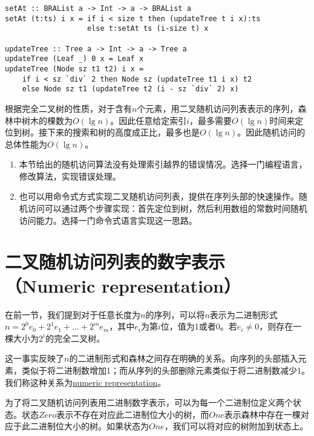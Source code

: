 \documentclass[UTF8]{article}
\begin{document}
\begin{lstlisting}[style=Haskell]
setAt :: BRAList a -> Int -> a -> BRAList a
setAt (t:ts) i x = if i < size t then (updateTree t i x):ts
                   else t:setAt ts (i-size t) x

updateTree :: Tree a -> Int -> a -> Tree a
updateTree (Leaf _) 0 x = Leaf x
updateTree (Node sz t1 t2) i x =
    if i < sz `div` 2 then Node sz (updateTree t1 i x) t2
    else Node sz t1 (updateTree t2 (i - sz `div` 2) x)
\end{lstlisting}

根据完全二叉树的性质，对于含有$n$个元素，用二叉随机访问列表表示的序列，森林中树木的棵数为$O(\lg n)$。因此任意给定索引$i$，最多需要$O(\lg n)$时间来定位到树。接下来的搜索和树的高度成正比，最多也是$O(\lg n)$。因此随机访问的总体性能为$O(\lg n)$。

\begin{Exercise}
\begin{enumerate}
\item 本节给出的随机访问算法没有处理索引越界的错误情况。选择一门编程语言，修改算法，实现错误处理。

\item 也可以用命令式方式实现二叉随机访问列表，提供在序列头部的快速操作。随机访问可以通过两个步骤实现：首先定位到树，然后利用数组的常数时间随机访问能力。选择一门命令式语言实现这一思路。
\end{enumerate}
\end{Exercise}

\section{二叉随机访问列表的数字表示（Numeric representation）}

在前一节，我们提到对于任意长度为$n$的序列，可以将$n$表示为二进制形式$n = 2^0e_0 + 2^1e_1 + ... + 2^me_m$，其中$e_i$为第$i$位，值为1或者0。若$e_i \neq 0$，则存在一棵大小为$2^i$的完全二叉树。

这一事实反映了$n$的二进制形式和森林之间存在明确的关系。向序列的头部插入元素，类似于将二进制数增加1；而从序列的头部删除元素类似于将二进制数减少1。我们称这种关系为\underline{numeric representation}\cite{okasaki-book}。

为了将二叉随机访问列表用二进制数字表示，可以为每一个二进制位定义两个状态。状态$Zero$表示不存在对应此二进制位大小的树，而$One$表示森林中存在一棵对应于此二进制位大小的树。如果状态为$One$，我们可以将对应的树附加到状态上。
\end{document}
